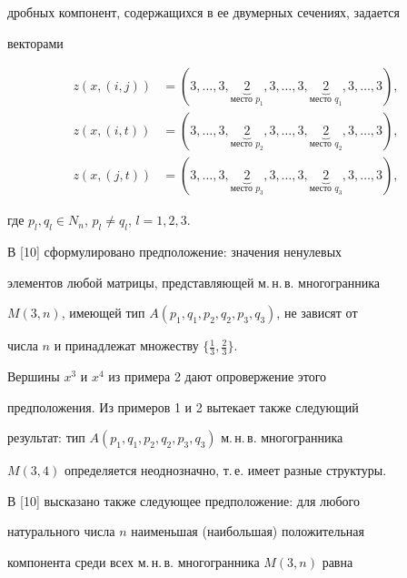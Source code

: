 дробных компонент, содержащихся в ее двумерных сечениях, задается


векторами


\begin{align*}


z(x,(i,j))&=(3,\dotsc,3,\underbrace{2}_{\text{место $p_1$}},


3,\dotsc,3,\underbrace{2}_{\text{место $q_1$}}


,3,\dotsc,3), \\


%


z(x,(i,t))&=(3,\dotsc,3,\underbrace{2}_{\text{место $p_2$}}


,3,\dotsc,3,\underbrace{2}_{\text{место $q_2$}},3,\dotsc,3),\\


%


z(x,(j,t))&=(3,\dotsc,3,\underbrace{2}_{\text{место $p_3$}}


,3,\dotsc,3,\underbrace{2}_{\text{место $q_3$}}


,3,\dotsc,3),


\end{align*}


где $p_l,q_l\in N_n$, $p_l\neq q_l$, $l=1,2,3$.





В [10] сформулировано предположение: значения ненулевых


элементов любой матрицы, представляющей м.\,н.\,в. многогранника


$M(3,n)$, имеющей тип $A(p_1,q_1,p_2,q_2,p_3,q_3)$, не зависят от


числа $n$ и принадлежат множеству $\{\frac{1}{3},\frac{2}{3}\}$.


Вершины $x^3$ и $x^4$ из примера 2 дают опровержение этого


предположения. Из примеров 1 и 2 вытекает также следующий


результат: тип $A(p_1,q_1,p_2,q_2,p_3,q_3)$ м.\,н.\,в. многогранника


$M(3,4)$ определяется неоднозначно, т.\,е. имеет разные структуры.





В [10] высказано также следующее предположение: для любого


натурального числа $n$ наименьшая (наибольшая) положительная


компонента среди всех м.\,н.\,в. многогранника $M(3,n)$ равна



